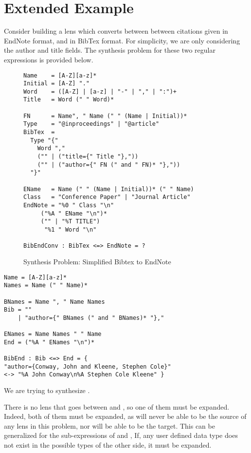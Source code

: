 \section{Extended Example}

Consider building a lens which converts between between citations given
in EndNote format, and in BibTex format.  For simplicity, we are only
considering the author and title fields.  The synthesis problem for these
two regular expressions is provided below.

\begin{figure}
\begin{lstlisting}
Name    = [A-Z][a-z]*
Initial = [A-Z] "."
Word    = ([A-Z] | [a-z] | "-" | "," | ":")+
Title   = Word (" " Word)*

FN      = Name", " Name (" " (Name | Initial))*
Type    = "@inproceedings" | "@article"
BibTex  = 
  Type "{" 
    Word ","
    ("" | ("title={" Title "},"))
    ("" | ("author={" FN (" and " FN)* "},")) 
  "}"

EName   = Name (" " (Name | Initial))* (" " Name)
Class   = "Conference Paper" | "Journal Article"
EndNote = "%0 " Class "\n"
	 ("%A " EName "\n")*
	 ("" | "%T TITLE")
	  "%1 " Word "\n"

BibEndConv : BibTex <=> EndNote = ?
\end{lstlisting}
\caption{Synthesis Problem: Simplified Bibtex to EndNote}
\end{figure}

\begin{lstlisting}
Name = [A-Z][a-z]*
Names = Name (" " Name)*

BNames = Name ", " Name Names
Bib = ""
    | "author={" BNames (" and " BNames)* "},"

ENames = Name Names " " Name
End = ("%A " ENames "\n")*

BibEnd : Bib <=> End = {
"author={Conway, John and Kleene, Stephen Cole}"
<-> "%A John Conway\n%A Stephen Cole Kleene" }
\end{lstlisting}


We are trying to synthesize \BibEnd{}.

There is no lens that goes between \BibTex{} and \EndNote{}, so one of them must
be expanded.
Indeed, both of them must be expanded, as \BibTex{} will never be able to be
the source of any lens in this problem, nor will \EndNote{} be able to be the
target.
This can be generalized for the sub-expressions of \BibTex{} and \EndNote{},  
If, any user defined data type does not exist in the possible types of the
other side, it must be expanded.

